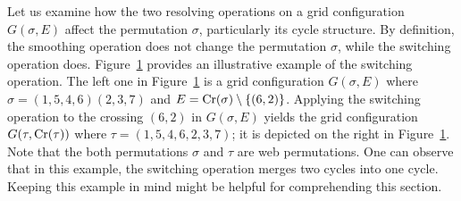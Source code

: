 Let us examine how the two resolving operations on a grid configuration
\( G(\sigma,E) \) affect the permutation \( \sigma \), particularly its cycle structure.
By definition, the smoothing operation does not change the permutation \(\sigma\),
while the switching operation does.
Figure~\ref{fig:switching_example} provides an illustrative example of the switching operation.
The left one in Figure~\ref{fig:switching_example} is a grid
configuration \( G(\sigma, E) \) where \( \sigma=(1,5,4,6)(2,3,7) \)
and \( E=\operatorname{Cr}(\sigma)\setminus\{(6,2)\} \).
Applying the switching operation to the crossing \( (6,2) \) in \( G(\sigma,E) \)
yields the grid configuration \( G(\tau, \operatorname{Cr}(\tau)) \) where \( \tau=(1,5,4,6,
2,3,7) \); it is depicted on the right in Figure~\ref{fig:switching_example}.
Note that the both permutations \( \sigma \) and \( \tau \) are web permutations.
One can observe that in this example, the switching operation merges two cycles
into one cycle.
Keeping this example in mind might be helpful for comprehending this section.

\begin{figure}
  \qquad\qquad
  \caption{}
  \label{fig:switching_example}
\end{figure}

